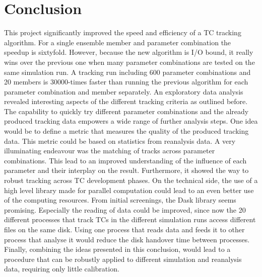 \chapter{Conclusion}\label{sec:conclusion}
This project significantly improved the speed and efficiency of a TC tracking algorithm. For a single ensemble member and parameter combination the speedup is sixtyfold. However, because the new algorithm is I/O bound, it really wins over the previous one when many parameter combinations are tested on the same simulation run. A tracking run including 600 parameter combinations and 20 members is 30000-times faster than running the previous algorithm for each parameter combination and member separately. \newline
An exploratory data analysis revealed interesting aspects of the different tracking criteria as outlined before. The capability to quickly try different parameter combinations and the already produced tracking data empowers a wide range of further analysis steps. One idea would be to define a metric that measures the quality of the produced tracking data. This metric could be based on statistics from reanalysis data.\newline
A very illuminating endeavour was the matching of tracks across parameter combinations. This lead to an improved understanding of the influence of each parameter and their interplay on the result. Furthermore, it showed the way to robust tracking across TC development phases.\newline
On the technical side, the use of a high level library made for parallel computation could lead to an even better use of the computing resources. From initial screenings, the Dask library \cite{dask} seems promising. Especially the reading of data could be improved, since now the 20 different processes that track TCs in the different simulation runs access different files on the same disk. Using one process that reads data and feeds it to other process that analyse it would reduce the disk handover time between processes.\newline
Finally, combining the ideas presented in this conclusion, would lead to a procedure that can be robustly applied to different simulation and reanalysis data, requiring only little calibration.
